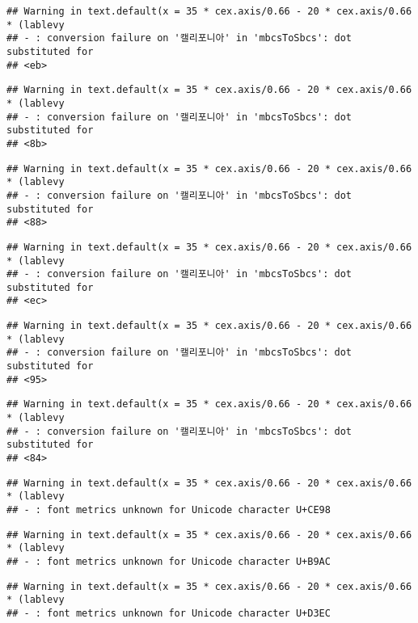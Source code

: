 \documentclass[
]{article}
\begin{document}
\begin{verbatim}
## Warning in text.default(x = 35 * cex.axis/0.66 - 20 * cex.axis/0.66 * (lablevy
## - : conversion failure on '캘리포니아' in 'mbcsToSbcs': dot substituted for
## <eb>
\end{verbatim}

\begin{verbatim}
## Warning in text.default(x = 35 * cex.axis/0.66 - 20 * cex.axis/0.66 * (lablevy
## - : conversion failure on '캘리포니아' in 'mbcsToSbcs': dot substituted for
## <8b>
\end{verbatim}

\begin{verbatim}
## Warning in text.default(x = 35 * cex.axis/0.66 - 20 * cex.axis/0.66 * (lablevy
## - : conversion failure on '캘리포니아' in 'mbcsToSbcs': dot substituted for
## <88>
\end{verbatim}

\begin{verbatim}
## Warning in text.default(x = 35 * cex.axis/0.66 - 20 * cex.axis/0.66 * (lablevy
## - : conversion failure on '캘리포니아' in 'mbcsToSbcs': dot substituted for
## <ec>
\end{verbatim}

\begin{verbatim}
## Warning in text.default(x = 35 * cex.axis/0.66 - 20 * cex.axis/0.66 * (lablevy
## - : conversion failure on '캘리포니아' in 'mbcsToSbcs': dot substituted for
## <95>
\end{verbatim}

\begin{verbatim}
## Warning in text.default(x = 35 * cex.axis/0.66 - 20 * cex.axis/0.66 * (lablevy
## - : conversion failure on '캘리포니아' in 'mbcsToSbcs': dot substituted for
## <84>
\end{verbatim}

\begin{verbatim}
## Warning in text.default(x = 35 * cex.axis/0.66 - 20 * cex.axis/0.66 * (lablevy
## - : font metrics unknown for Unicode character U+CE98
\end{verbatim}

\begin{verbatim}
## Warning in text.default(x = 35 * cex.axis/0.66 - 20 * cex.axis/0.66 * (lablevy
## - : font metrics unknown for Unicode character U+B9AC
\end{verbatim}

\begin{verbatim}
## Warning in text.default(x = 35 * cex.axis/0.66 - 20 * cex.axis/0.66 * (lablevy
## - : font metrics unknown for Unicode character U+D3EC
\end{verbatim}
\end{document}
